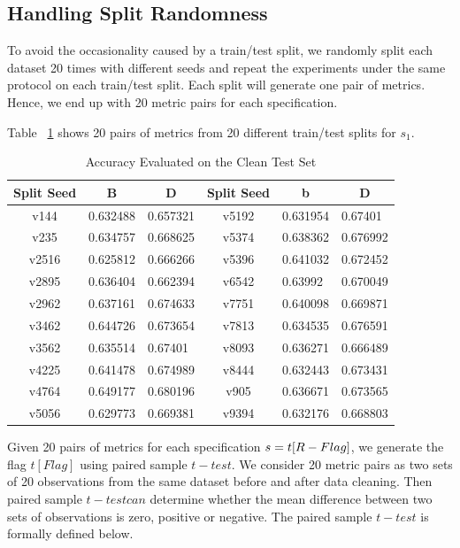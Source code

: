 \subsection{Handling Split Randomness}
To avoid the occasionality caused by a train/test split, we randomly split each dataset 20 times with different seeds and repeat the experiments under the same protocol on each train/test split. Each split will generate one pair of metrics. Hence, we end up with
20 metric pairs for each specification.

\begin{example}
	Table ~\ref{tab:accuracy-evulated-on-the-clean-test-set} shows 20 pairs of metrics from 20 different train/test splits for $s_{1}$.
\end{example}

\begin{table}[H]
	\centering
	\begin{tabular}{|c|l|l|c|l|l|}
		\hline
		Split Seed & \multicolumn{1}{c|}{B} & \multicolumn{1}{c|}{D} & Split Seed & \multicolumn{1}{c|}{b} & \multicolumn{1}{c|}{D} \\ \hline
		v144 & 0.632488 & 0.657321 & v5192 & 0.631954 & 0.67401 \\ \hline
		v235 & 0.634757 & 0.668625 & v5374 & 0.638362 & 0.676992 \\ \hline
		v2516 & 0.625812 & 0.666266 & v5396 & 0.641032 & 0.672452 \\ \hline
		v2895 & 0.636404 & 0.662394 & v6542 & 0.63992 & 0.670049 \\ \hline
		v2962 & 0.637161 & 0.674633 & v7751 & 0.640098 & 0.669871 \\ \hline
		v3462 & 0.644726 & 0.673654 & v7813 & 0.634535 & 0.676591 \\ \hline
		v3562 & 0.635514 & 0.67401 & v8093 & 0.636271 & 0.666489 \\ \hline
		v4225 & 0.641478 & 0.674989 & v8444 & 0.632443 & 0.673431 \\ \hline
		v4764 & 0.649177 & 0.680196 & v905 & 0.636671 & 0.673565 \\ \hline
		v5056 & 0.629773 & 0.669381 & v9394 & 0.632176 & 0.668803 \\ \hline
	\end{tabular}
	\caption{Accuracy Evaluated on the Clean Test Set}
	\label{tab:accuracy-evulated-on-the-clean-test-set}
\end{table}

Given 20 pairs of metrics for each specification $s = t[R \-- Flag]$,
we generate the flag $t[Flag]$ using paired sample $t-test$. We consider 20 metric pairs as two sets of 20 observations from the same dataset before and after data cleaning. 
Then paired sample $t-test can$ determine whether the mean difference between two sets of
observations is zero, positive or negative. The paired sample $t-test$ is formally defined below. 

